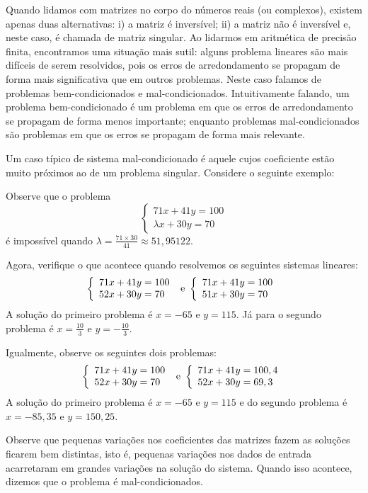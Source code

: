 Quando lidamos com matrizes no corpo do números reais (ou complexos), existem apenas duas alternativas: i) a matriz é inversível; ii) a matriz não é inversível e, neste caso, é chamada de matriz singular. Ao lidarmos em aritmética de precisão finita, encontramos uma situação mais sutil: alguns problema lineares são mais difíceis de serem resolvidos, pois os erros de arredondamento se propagam de forma mais significativa que em outros problemas. Neste caso falamos de problemas bem-condicionados e mal-condicionados. Intuitivamente falando, um problema bem-condicionado é um problema em que os erros de arredondamento se propagam de forma menos importante; enquanto problemas mal-condicionados são problemas em que os erros se propagam de forma mais relevante.

Um caso típico de sistema mal-condicionado é aquele cujos coeficiente estão muito próximos ao de um problema singular. Considere o seguinte exemplo:

\begin{ex} Observe que o problema
$$\left\{ \begin{array}{l}71x+41y=100\\
\lambda x+30y=70
\end{array}
\right.$$
é impossível quando $\lambda= \frac{71\times 30}{41}\approx 51,95122$.

Agora, verifique o que acontece quando resolvemos os seguintes sistemas lineares:
$$\left\{ \begin{array}{l}71x+41y=100\\
52x+30y=70
\end{array}
\right. \\ \hbox{ e }
\left\{ \begin{array}{l}71x+41y=100\\
51x+30y=70
\end{array}
\right. \\
$$
A solução do primeiro problema é $x=-65$ e $y=115$. Já para o segundo problema é $x=\frac{10}{3}$ e $y=-\frac{10}{3}$.

Igualmente, observe os seguintes dois problemas:
$$\left\{ \begin{array}{l}71x+41y=100\\
52x+30y=70
\end{array}
\right. \\ \hbox{ e }
\left\{ \begin{array}{l}71x+41y=100,4\\
52x+30y=69,3
\end{array}
\right. \\
$$
A solução do primeiro problema é $x=-65$ e $y=115$ e do segundo problema é $x=-85,35$ e $y=150,25$.

Observe que pequenas variações nos coeficientes das matrizes fazem as soluções ficarem bem distintas, isto é, pequenas variações nos dados de entrada acarretaram em grandes variações na solução do sistema. Quando isso acontece, dizemos que o problema é mal-condicionados.
\end{ex}

